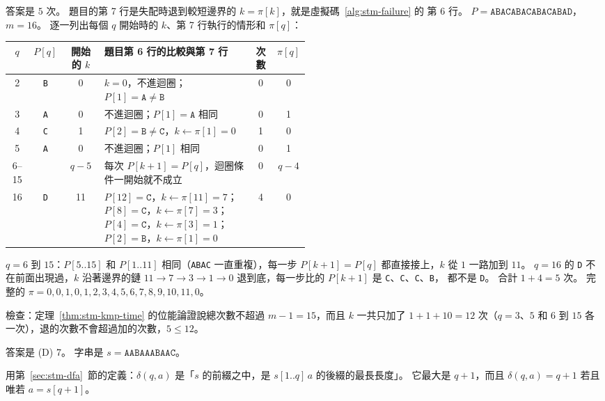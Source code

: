 答案是 $5$ 次。 題目的第 7 行是失配時退到較短邊界的 $k = \pi[k]$，就是虛擬碼~\ref{alg:stm-failure} 的
第 6 行。 $P = \mathtt{ABACABACABACABAD}$，$m = 16$。 逐一列出每個 $q$ 開始時的 $k$、第 7 行執行的情形和
$\pi[q]$：

\begin{center}
\small
\begin{tabular}{ccc>{\raggedright\arraybackslash}p{0.5\linewidth}cc}
\toprule
$q$ & $P[q]$ & 開始的 $k$ & 題目第 6 行的比較與第 7 行 & 次數 & $\pi[q]$ \\
\midrule
2 & \texttt{B} & 0 & $k = 0$，不進迴圈；$P[1] = \mathtt{A} \ne \mathtt{B}$ & 0 & 0 \\
3 & \texttt{A} & 0 & 不進迴圈；$P[1] = \mathtt{A}$ 相同 & 0 & 1 \\
4 & \texttt{C} & 1 & $P[2] = \mathtt{B} \ne \mathtt{C}$，$k \gets \pi[1] = 0$ & 1 & 0 \\
5 & \texttt{A} & 0 & 不進迴圈；$P[1]$ 相同 & 0 & 1 \\
6--15 & & $q - 5$ & 每次 $P[k+1] = P[q]$，迴圈條件一開始就不成立 & 0 & $q - 4$ \\
16 & \texttt{D} & 11 & $P[12] = \mathtt{C}$，$k \gets \pi[11] = 7$；$P[8] = \mathtt{C}$，$k \gets \pi[7] = 3$；
$P[4] = \mathtt{C}$，$k \gets \pi[3] = 1$；$P[2] = \mathtt{B}$，$k \gets \pi[1] = 0$ & 4 & 0 \\
\bottomrule
\end{tabular}
\end{center}

$q = 6$ 到 $15$：$P[5..15]$ 和 $P[1..11]$ 相同（\texttt{ABAC} 一直重複），每一步 $P[k + 1] = P[q]$
都直接接上，$k$ 從 $1$ 一路加到 $11$。 $q = 16$ 的 \texttt{D} 不在前面出現過，$k$ 沿著邊界的鏈
$11 \to 7 \to 3 \to 1 \to 0$ 退到底，每一步比的 $P[k + 1]$ 是 \texttt{C}、\texttt{C}、\texttt{C}、\texttt{B}，
都不是 \texttt{D}。 合計 $1 + 4 = 5$ 次。 完整的
$\pi = 0, 0, 1, 0, 1, 2, 3, 4, 5, 6, 7, 8, 9, 10, 11, 0$。

檢查：定理~\ref{thm:stm-kmp-time} 的位能論證說總次數不超過 $m - 1 = 15$，而且 $k$ 一共只加了 $1 + 1 + 10 = 12$
次（$q = 3$、$5$ 和 $6$ 到 $15$ 各一次），退的次數不會超過加的次數，$5 \le 12$。

答案是 (D) 7。 字串是 $s = \mathtt{AABAAABAAC}$。

用第~\ref{sec:stm-dfa}~節的定義：$\delta(q, a)$ 是「$s$ 的前綴之中，是 $s[1..q]\,a$ 的後綴的最長長度」。
它最大是 $q + 1$，而且 $\delta(q, a) = q + 1$ 若且唯若 $a = s[q + 1]$。


